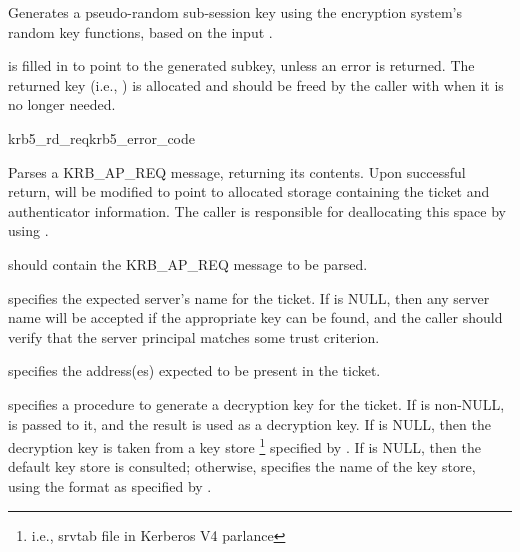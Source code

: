 Generates a pseudo-random sub-session key using the encryption system's
random key functions, based on the input .

 is filled in to point to the generated subkey, unless
an error is returned.  The returned key (i.e., ) is
allocated and should be freed by the caller with
 when it is no longer needed.

\begin{funcdecl}{krb5_rd_req}{krb5_error_code}{\funcin}
\funcendfuncarg
{}
\funcinout
{}
\funcout
{}
\end{funcdecl}

Parses a KRB_AP_REQ message, returning its contents.  Upon successful
return,
 will be modified to point to allocated storage
containing the ticket and authenticator information.  The caller is
responsible for deallocating this space by using
.

 should contain the KRB_AP_REQ message to be parsed.

 specifies the expected server's name for the ticket.
If  is NULL, then any server name will be accepted if
the appropriate key can be found, and the caller should verify that the
server principal matches some trust criterion.

 specifies the address(es) expected to be present
in the ticket.

 specifies a procedure to generate a decryption key for the
ticket.  If  is non-NULL,  is
passed to it, and the result is used as a decryption key. If
 is NULL, then the decryption key is taken from a key store
\footnote{i.e., srvtab file in Kerberos V4 parlance} specified by
.  If  is NULL, then the
default key store is consulted; otherwise, 
specifies the name of the key store, using the format as specified by
.



